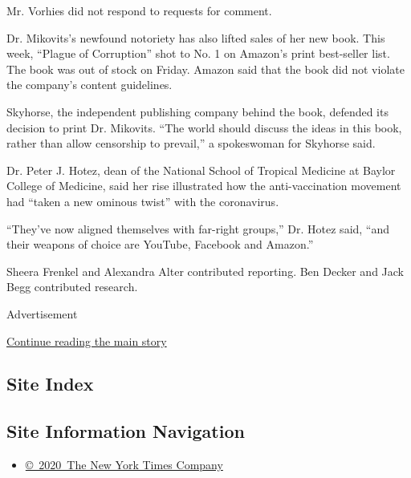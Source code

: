 Mr. Vorhies did not respond to requests for comment.

Dr. Mikovits's newfound notoriety has also lifted sales of her new book.
This week, ``Plague of Corruption'' shot to No. 1 on Amazon's print
best-seller list. The book was out of stock on Friday. Amazon said that
the book did not violate the company's content guidelines.

Skyhorse, the independent publishing company behind the book, defended
its decision to print Dr. Mikovits. ``The world should discuss the ideas
in this book, rather than allow censorship to prevail,'' a spokeswoman
for Skyhorse said.

Dr. Peter J. Hotez, dean of the National School of Tropical Medicine at
Baylor College of Medicine, said her rise illustrated how the
anti-vaccination movement had ``taken a new ominous twist'' with the
coronavirus.

``They've now aligned themselves with far-right groups,'' Dr. Hotez
said, ``and their weapons of choice are YouTube, Facebook and Amazon.''

Sheera Frenkel and Alexandra Alter contributed reporting. Ben Decker and
Jack Begg contributed research.

Advertisement

\protect\hyperlink{after-bottom}{Continue reading the main story}

\hypertarget{site-index}{%
\subsection{Site Index}\label{site-index}}

\hypertarget{site-information-navigation}{%
\subsection{Site Information
Navigation}\label{site-information-navigation}}

\begin{itemize}
\tightlist
\item
  \href{https://help.nytimes3xbfgragh.onion/hc/en-us/articles/115014792127-Copyright-notice}{©~2020~The
  New York Times Company}
\end{itemize}

